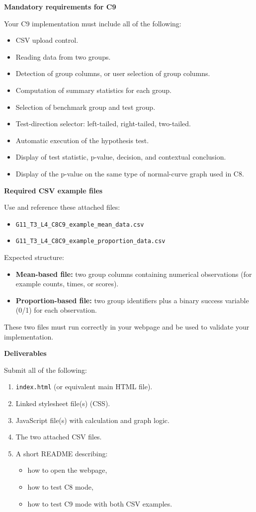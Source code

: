 \documentclass[12pt]{article}
\newcommand{\SubsectionBox}[1]{%
\noindent\colorbox{gray!30}{%
\parbox{\linewidth}{\textbf{#1}}%
}\par\vspace{0.35cm}%
}
\begin{document}
\SubsectionBox{Mandatory requirements for C9}
Your C9 implementation must include all of the following:
\begin{itemize}
\item CSV upload control.
\item Reading data from two groups.
\item Detection of group columns, or user selection of group columns.
\item Computation of summary statistics for each group.
\item Selection of benchmark group and test group.
\item Test-direction selector: left-tailed, right-tailed, two-tailed.
\item Automatic execution of the hypothesis test.
\item Display of test statistic, p-value, decision, and contextual conclusion.
\item Display of the p-value on the same type of normal-curve graph used in C8.
\end{itemize}

\SubsectionBox{Required CSV example files}
Use and reference these attached files:
\begin{itemize}
\item \texttt{G11\_T3\_L4\_C8C9\_example\_mean\_data.csv}
\item \texttt{G11\_T3\_L4\_C8C9\_example\_proportion\_data.csv}
\end{itemize}

Expected structure:
\begin{itemize}
\item \textbf{Mean-based file:} two group columns containing numerical observations (for example counts, times, or scores).
\item \textbf{Proportion-based file:} two group identifiers plus a binary success variable (0/1) for each observation.
\end{itemize}

These two files must run correctly in your webpage and be used to validate your implementation.

\SubsectionBox{Deliverables}
Submit all of the following:
\begin{enumerate}
\item \texttt{index.html} (or equivalent main HTML file).
\item Linked stylesheet file(s) (CSS).
\item JavaScript file(s) with calculation and graph logic.
\item The two attached CSV files.
\item A short README describing:
\begin{itemize}
\item how to open the webpage,
\item how to test C8 mode,
\item how to test C9 mode with both CSV examples.
\end{itemize}
\end{enumerate}
\end{document}
